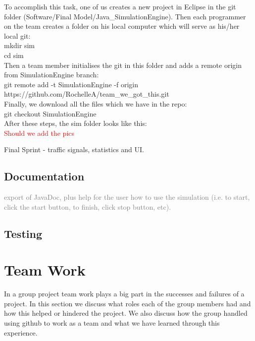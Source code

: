 \documentclass{article}
\begin{document}
\noindent
To accomplish this task, one of us creates a new project in Eclipse in the git folder (Software/Final Model/Java\_SimulationEngine). 
Then each programmer on the team creates a folder on his local computer which will serve as his/her local git:\\

mkdir sim\\

cd sim\\

\noindent
Then a team member initialises the git in this folder and adds a remote origin from SimulationEngine branch:\\

\noindent
git remote add -t SimulationEngine -f origin https://github.com/RochelleA/team\_we\_got\_this.git\\

\noindent
Finally, we download all the files which we have in the repo:\\

\noindent
git checkout SimulationEngine\\

\noindent
After these steps, the sim folder looks like this: \\
\textcolor{red}{Should we add the pics}

Final Sprint - traffic signals, statistics and UI. 

	\subsection{Documentation}
		\textcolor{gray}{export of JavaDoc, plus help for the user how to use the simulation (i.e. to start, click the start button, to finish, click stop button, etc).}
		
		
	\subsection{Testing}

\section{Team Work}
In a group project team work plays a big part in the successes and failures of a project. In this section we discuss what roles each of the group members had and how this helped or hindered the project. We also discuss how the group handled using github to work as a team and what we have learned through this experience. 
\end{document}
